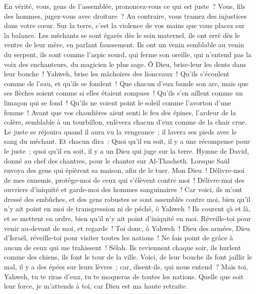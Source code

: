 \begin{multicols}{2}
En vérité, vous, gens de l'assemblée, prononcez-vous ce qui est juste~? Vous, fils des hommes, jugez-vous avec droiture~?
Au contraire, vous tramez des injustices dans votre cœur. Sur la terre, c'est la violence de vos mains que vous placez sur la balance.
Les méchants se sont égarés dès le sein maternel, ils ont erré dès le ventre de leur mère, en parlant faussement.
Ils ont un venin semblable au venin du serpent, ils sont comme l'aspic sourd, qui ferme son oreille,
qui n'entend pas la voix des enchanteurs, du magicien le plus sage.
Ô Dieu, brise-leur les dents dans leur bouche~! Yahweh, brise les mâchoires des lionceaux~!
Qu'ils s'écoulent comme de l'eau, et qu'ils se fondent~! Que chacun d'eux bande son arc, mais que ses flèches soient comme si elles étaient rompues~!
Qu'ils s'en aillent comme un limaçon qui se fond~! Qu'ils ne voient point le soleil comme l'avorton d'une femme~!
Avant que vos chaudières aient senti le feu des épines, l'ardeur de la colère, semblable à un tourbillon, enlèvera chacun d'eux comme de la chair crue.
Le juste se réjouira quand il aura vu la vengeance~; il lavera ses pieds avec le sang du méchant.
Et chacun dira~: Quoi qu'il en soit, il y a une récompense pour le juste~; quoi qu'il en soit, il y a un Dieu qui juge sur la terre.
\VerseOne{}Hymne de David, donné au chef des chantres, pour le chanter sur Al-Thasheth. Lorsque Saül envoya des gens qui épièrent sa maison, afin de le tuer.
Mon Dieu~! Délivre-moi de mes ennemis, protège-moi de ceux qui s'élèvent contre moi~!
Délivre-moi des ouvriers d'iniquité et garde-moi des hommes sanguinaires~!
Car voici, ils m'ont dressé des embûches, et des gens robustes se sont assemblés contre moi, bien qu'il n'y ait point en moi de transgression ni de péché, ô Yahweh~!
Ils courent çà et là, et se mettent en ordre, bien qu'il n'y ait point d'iniquité en moi. Réveille-toi pour venir au-devant de moi, et regarde~!
Toi donc, ô Yahweh~! Dieu des armées, Dieu d'Israël, réveille-toi pour visiter toutes les nations~! Ne fais point de grâce à aucun de ceux qui me trahissent~! Sélah.
Ils reviennent chaque soir, ils hurlent comme des chiens, ils font le tour de la ville.
Voici, de leur bouche ils font jaillir le mal, il y a des épées sur leurs lèvres~; car, disent-ils, qui nous entend~?
Mais toi, Yahweh, tu te riras d'eux, tu te moqueras de toutes les nations.
Quelle que soit leur force, je m'attends à toi, car Dieu est ma haute retraite.

\end{multicols}
